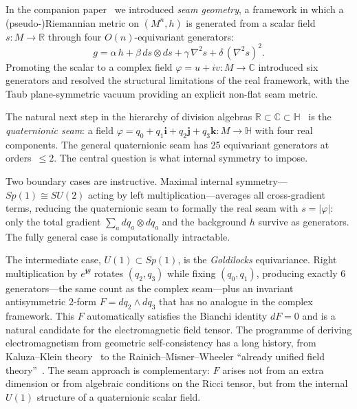 \documentclass[pdflatex,sn-mathphys-num]{sn-jnl}
\theoremstyle{thmstyleone}%
\theoremstyle{thmstyletwo}%
\theoremstyle{thmstylethree}%
\newcommand{\nn}{\nabla}
\numberwithin{equation}{section}
\begin{document}
In the companion paper~\cite{seam1} we introduced \emph{seam geometry},
a framework in which a (pseudo-)Riemannian metric on $(M^n,h)$ is
generated from a scalar field $s\colon M\to\mathbb{R}$ through four
$O(n)$-equivariant generators:
\begin{equation}
\label{eq:real-seam}
g = \alpha\,h + \beta\,ds\otimes ds
    + \gamma\,\nn^2 s + \delta\,(\nn^2 s)^2.
\end{equation}
Promoting the scalar to a complex field
$\varphi = u + iv\colon M\to\mathbb{C}$ introduced six generators
and resolved the structural limitations of the real framework, with
the Taub plane-symmetric vacuum providing an explicit non-flat seam
metric.

The natural next step in the hierarchy of division algebras
$\mathbb{R}\subset\mathbb{C}\subset\mathbb{H}$~\cite{BaezHuerta2010} is the
\emph{quaternionic seam}: a field
$\varphi = q_0 + q_1\mathbf{i} + q_2\mathbf{j} + q_3\mathbf{k}
\colon M\to\mathbb{H}$ with four real components.
The general quaternionic seam has 25 equivariant generators at
orders~$\le 2$.  The central question is what internal symmetry
to impose.

Two boundary cases are instructive.  Maximal internal
symmetry---$Sp(1)\cong SU(2)$ acting by left
multiplication---averages all cross-gradient terms, reducing the
quaternionic seam to formally the real seam with $s = |\varphi|$:
only the total gradient $\sum_a dq_a\otimes dq_a$ and the
background $h$ survive as generators.  The fully general case
is computationally intractable.

The intermediate case, $U(1)\subset Sp(1)$, is the
\emph{Goldilocks} equivariance.  Right multiplication by
$e^{\mathbf{i}\theta}$ rotates $(q_2,q_3)$ while fixing
$(q_0,q_1)$, producing exactly 6 generators---the same count as
the complex seam---plus an invariant antisymmetric 2-form
$F = dq_2\wedge dq_3$ that has no analogue in the complex
framework.  This $F$ automatically satisfies the Bianchi identity
$dF = 0$ and is a natural candidate for the electromagnetic field
tensor.  The programme of deriving electromagnetism from
geometric self-consistency has a long history, from
Kaluza--Klein theory~\cite{Kaluza1921,Klein1926} to the
Rainich--Misner--Wheeler ``already unified field
theory''~\cite{Rainich1925,MisnerWheeler1957}.  The seam
approach is complementary: $F$ arises not from an extra
dimension or from algebraic conditions on the Ricci tensor,
but from the internal $U(1)$ structure of a quaternionic
scalar field.
\end{document}
